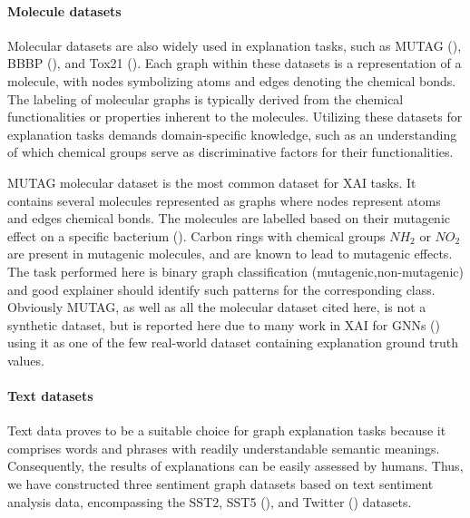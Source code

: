 \documentclass[binding=0.6cm]{sapthesis}
\newcommand{\mycite}[1]{(\cite{#1})}
\begin{document}
\paragraph{Molecule datasets}
\label{sec:expRes.molecule-dataset}
Molecular datasets are also widely used in explanation tasks, such as MUTAG \mycite{debnath1991-mutag}, BBBP \mycite{martins2012-BBBP}, and Tox21 \mycite{wu2018-moleculenet}. Each graph within these datasets is a representation of a molecule, with nodes symbolizing atoms and edges denoting the chemical bonds. The labeling of molecular graphs is typically derived from the chemical functionalities or properties inherent to the molecules. Utilizing these datasets for explanation tasks demands domain-specific knowledge, such as an understanding of which chemical groups serve as discriminative factors for their functionalities.

MUTAG molecular dataset is the most common dataset for XAI tasks. It contains several molecules represented as graphs where nodes represent atoms and edges chemical bonds. The molecules are labelled based on their mutagenic effect on a specific bacterium \mycite{debnath1991-mutag}. Carbon rings with chemical groups $NH_2$ or $NO_2$ are present in mutagenic molecules, and are known to lead to mutagenic effects.
The task performed here is binary graph classification (mutagenic,non-mutagenic) and good explainer should identify such patterns for the corresponding class. Obviously MUTAG, as well as all the molecular dataset cited here, is not a synthetic dataset, but is reported here due to many work in XAI for GNNs (\cite{ying2019-gnnexplainer,luo2020-pgexplainer,spinelli2022-mate-maml}) using it as one of the few real-world dataset containing explanation ground truth values.


\paragraph{Text datasets}
\label{sec:expRes.text-data}
Text data proves to be a suitable choice for graph explanation tasks because it comprises words and phrases with readily understandable semantic meanings. Consequently, the results of explanations can be easily assessed by humans. Thus, we have constructed three sentiment graph datasets based on text sentiment analysis data, encompassing the SST2, SST5 \mycite{socher2013-SST2-5}, and Twitter \mycite{dong2014-twitter} datasets.
\end{document}
